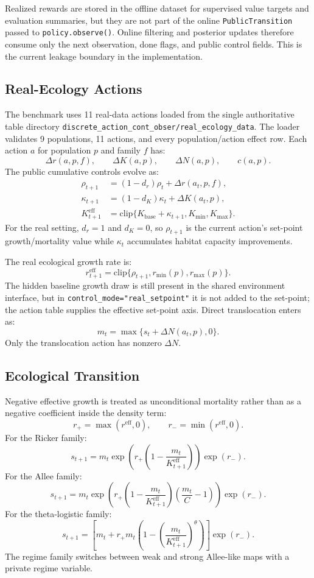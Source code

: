 \documentclass[11pt]{article}
\newcommand{\code}[1]{\texttt{#1}}
\newcommand{\1}{\mathbf{1}}
\begin{document}
Realized rewards are stored in the offline dataset for supervised value targets
and evaluation summaries, but they are not part of the online
\code{PublicTransition} passed to \code{policy.observe()}.  Online filtering and
posterior updates therefore consume only the next observation, done flags, and
public control fields.  This is the current leakage boundary in the
implementation.

\subsection{Real-Ecology Actions}

The benchmark uses 11 real-data actions loaded from the single authoritative
table directory \code{discrete\_action\_cont\_obser/real\_ecology\_data}.  The
loader validates 9 populations, 11 actions, and every population/action effect
row.  Each action $a$ for population $p$ and family $f$ has:
\[
  \Delta r(a,p,f),\qquad \Delta K(a,p),\qquad
  \Delta N(a,p),\qquad c(a,p).
\]
The public cumulative controls evolve as:
\begin{align}
  \rho_{t+1} &= (1-d_r)\rho_t+\Delta r(a_t,p,f),\\
  \kappa_{t+1} &= (1-d_K)\kappa_t+\Delta K(a_t,p),\\
  K^{\mathrm{eff}}_{t+1}
    &= \mathrm{clip}\{K_{\mathrm{base}}+\kappa_{t+1},K_{\min},K_{\max}\}.
\end{align}
For the real setting, $d_r=1$ and $d_K=0$, so $\rho_{t+1}$ is the current action's
set-point growth/mortality value while $\kappa_t$ accumulates habitat capacity
improvements.

The real ecological growth rate is:
\[
  r^{\mathrm{eff}}_{t+1}
  = \mathrm{clip}\{\rho_{t+1},r_{\min}(p),r_{\max}(p)\}.
\]
The hidden baseline growth draw is still present in the shared environment
interface, but in \code{control\_mode="real\_setpoint"} it is not added to the
set-point; the action table supplies the effective set-point axis.
Direct translocation enters as:
\[
  m_t = \max\{s_t+\Delta N(a_t,p),0\}.
\]
Only the translocation action has nonzero $\Delta N$.

\subsection{Ecological Transition}

Negative effective growth is treated as unconditional mortality rather than as a
negative coefficient inside the density term:
\[
  r_+ = \max(r^{\mathrm{eff}},0),\qquad
  r_- = \min(r^{\mathrm{eff}},0).
\]
For the Ricker family:
\[
  s_{t+1}
  =
  m_t\exp\left(r_+\left(1-\frac{m_t}{K^{\mathrm{eff}}_{t+1}}\right)\right)
  \exp(r_-).
\]
For the Allee family:
\[
  s_{t+1}
  =
  m_t\exp\left(
    r_+\left(1-\frac{m_t}{K^{\mathrm{eff}}_{t+1}}\right)
       \left(\frac{m_t}{C}-1\right)
  \right)\exp(r_-).
\]
For the theta-logistic family:
\[
  s_{t+1}
  =
  \left[m_t+r_+m_t
  \left(1-\left(\frac{m_t}{K^{\mathrm{eff}}_{t+1}}\right)^\theta\right)\right]
  \exp(r_-).
\]
The regime family switches between weak and strong Allee-like maps with a
private regime variable.
\end{document}
